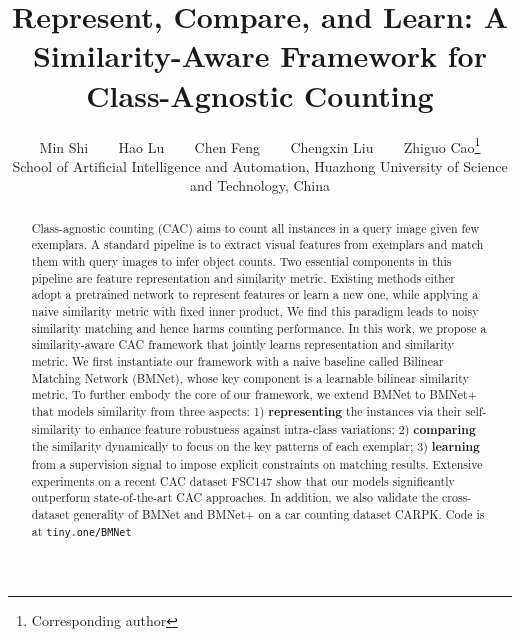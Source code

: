 \documentclass[10pt,twocolumn,letterpaper]{article}
\begin{document}
\title{Represent, Compare, and Learn: A Similarity-Aware Framework for\\Class-Agnostic Counting}

\author{Min Shi ~~~
\quad Hao Lu ~~~
\quad Chen Feng ~~~
\quad Chengxin Liu ~~~ 
\quad Zhiguo Cao\thanks{Corresponding author}\\
School of Artificial Intelligence and Automation, Huazhong University of Science and Technology, China\\

}

\maketitle
\begin{abstract}
Class-agnostic counting (CAC) aims to count all instances in a query image given few exemplars. A standard pipeline is to extract visual features from exemplars and match them with query images to infer object counts. Two essential components in this pipeline are feature representation and similarity metric. Existing methods either adopt a pretrained network to represent features or learn a new one, while applying a naive similarity metric with fixed inner product. We find this paradigm leads to noisy similarity matching and hence harms counting performance. In this work, we propose a similarity-aware CAC framework that jointly learns representation and similarity metric. We first instantiate our framework with a naive baseline called Bilinear Matching Network (BMNet),
whose key component is a learnable bilinear similarity metric. To further embody the core of our framework, we extend BMNet to BMNet+ that models similarity from three aspects: 1) \textbf{representing} the instances via their self-similarity to enhance feature robustness against intra-class variations; 2) \textbf{comparing} the similarity dynamically to focus on the key patterns of each exemplar; 3) \textbf{learning} from a supervision signal to impose explicit constraints on matching results.  Extensive experiments on a recent CAC dataset FSC147 show that our models significantly outperform state-of-the-art CAC approaches. In addition, we also validate the cross-dataset
generality of BMNet and BMNet+ on a car counting dataset CARPK. Code is at {\tt tiny.one/BMNet} 

\end{abstract}
\end{document}
